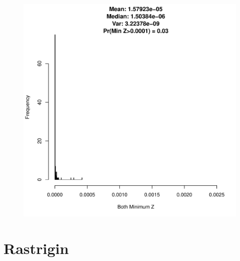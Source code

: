 \documentclass{article}
\begin{document}
\begin{figure}[h!]
\begin{center}
\begin{minipage}[h!]{0.32\textwidth}
                \end{minipage}
		\begin{minipage}[h!]{0.32\textwidth}
                        \includegraphics[width=1.0\textwidth]{bothSimHist.pdf}
                \end{minipage}
        \end{center}
\end{figure}

%
%
%

\section{\color{red}Rastrigin}
\end{document}
